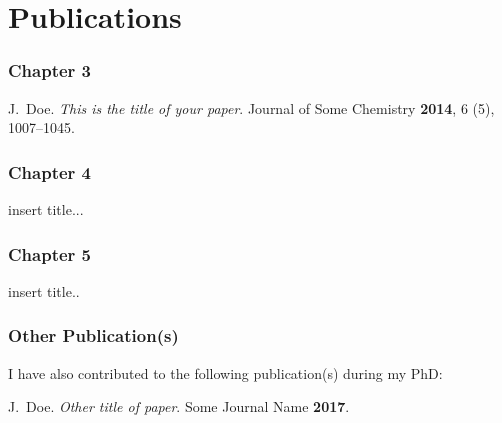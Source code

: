 \chapter*{\sc Publications}
\subsection*{Chapter 3}

J.~Doe. \textit{This is the title of your paper}. Journal of Some Chemistry \textbf{2014}, 6 (5), 1007--1045.


\subsection*{Chapter 4}
insert title... 
\subsection*{Chapter 5}
insert title..
\subsection*{Other Publication(s)}
I have also contributed to the following publication(s) during my PhD:

\noindent J.~Doe. \textit{Other title of paper}. Some Journal Name \textbf{2017}.

